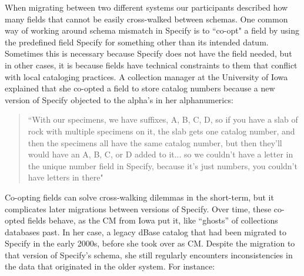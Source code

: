 When migrating between two different systems our participants described how many fields that cannot be easily cross-walked between schemas. One common way of working around schema mismatch in Specify is to “co-opt" a field by using the predefined field Specify for something other than its intended datum. Sometimes this is necessary because Specify does not have the field needed, but in other cases, it is because fields have technical constraints to them that conflict with local cataloging practices. A collection manager at the University of Iowa explained that she co-opted a field to store catalog numbers because a new version of Specify objected to the alpha’s in her alphanumerics:
\begin{quote}
“With our specimens, we have suffixes, A, B, C, D, so if you have a slab of rock with multiple specimens on it, the slab gets one catalog number, and then the specimens all have the same catalog number, but then they'll would have an A, B, C, or D added to it... so we couldn't have a letter in the unique number field in Specify, because it's just numbers, you couldn't have letters in there"
\end{quote}

Co-opting fields can solve cross-walking dilemmas in the short-term, but it complicates later migrations between versions of Specify. Over time, these co-opted fields behave, as the CM from Iowa put it, like “ghosts” of collections databases past. In her case, a legacy dBase catalog that had been migrated to Specify in the early 2000s, before she took over as CM. Despite the migration to that version of Specify's schema, she still regularly encounters inconsistencies in the data that originated in the older system. For instance: 

